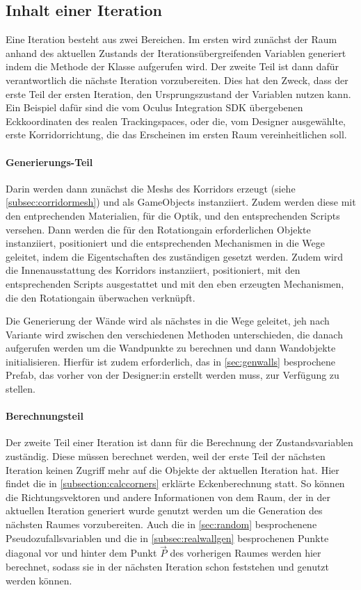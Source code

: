 \subsection{Inhalt einer Iteration}\label{subsec:iteration}
Eine Iteration besteht aus zwei Bereichen. Im ersten wird zunächst der Raum anhand des aktuellen Zustands der Iterationsübergreifenden Variablen generiert indem die  Methode der  Klasse aufgerufen wird. Der zweite Teil ist dann dafür verantwortlich die nächste Iteration vorzubereiten. Dies hat den Zweck, dass der erste Teil der ersten Iteration, den Ursprungszustand der Variablen nutzen kann. Ein Beispiel dafür sind die vom Oculus Integration SDK übergebenen Eckkoordinaten des realen Trackingspaces, oder die, vom Designer ausgewählte, erste Korridorrichtung, die das Erscheinen im ersten Raum vereinheitlichen soll.

\paragraph*{Generierungs-Teil}
Darin werden dann zunächst die Meshs des Korridors erzeugt (siehe \autoref{subsec:corridormesh}) und als GameObjects instanziiert. Zudem werden diese mit den entprechenden Materialien, für die Optik, und den entsprechenden Scripts versehen.
Dann werden die für den Rotationgain erforderlichen Objekte instanziiert, positioniert und die entsprechenden Mechanismen in die Wege geleitet, indem die Eigentschaften des zuständigen  gesetzt werden.
Zudem wird die Innenausstattung des Korridors instanziiert, positioniert, mit den entsprechenden Scripts ausgestattet und mit den eben erzeugten Mechanismen, die den Rotationgain überwachen verknüpft.

Die Generierung der Wände wird als nächstes in die Wege geleitet, jeh nach Variante wird zwischen den verschiedenen Methoden unterschieden, die danach aufgerufen werden um die Wandpunkte zu berechnen und dann Wandobjekte initialisieren. Hierfür ist zudem erforderlich, das in \autoref{sec:genwalls} besprochene Prefab, das vorher von der Designer:in erstellt werden muss, zur Verfügung zu stellen.

\paragraph*{Berechnungsteil}

Der zweite Teil einer Iteration ist dann für die Berechnung der Zustandsvariablen zuständig. Diese müssen berechnet werden, weil der erste Teil der nächsten Iteration keinen Zugriff mehr auf die Objekte der aktuellen Iteration hat. Hier findet die in \autoref{subsection:calccorners} erklärte Eckenberechnung statt. So können die Richtungsvektoren und andere Informationen von dem Raum, der in der aktuellen Iteration generiert wurde genutzt werden um die Generation des nächsten Raumes vorzubereiten. Auch die in \autoref{sec:random} besprochenene Pseudozufallsvariablen und die in \autoref{subsec:realwallgen} besprochenen Punkte diagonal vor und hinter dem Punkt $\vec{P}$ des vorherigen Raumes werden hier berechnet, sodass sie in der nächsten Iteration schon feststehen und genutzt werden können.

